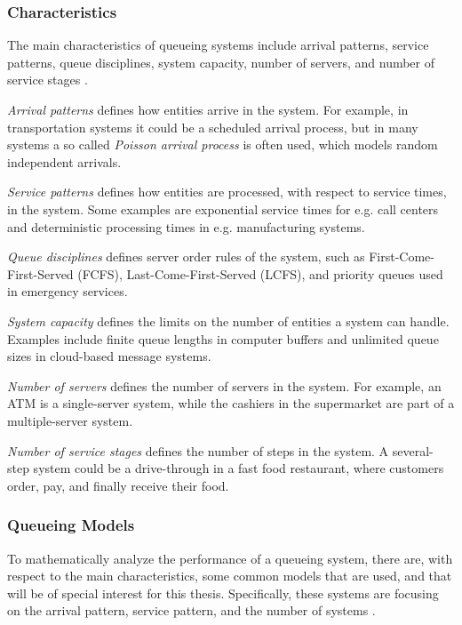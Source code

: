 \documentclass[a4paper,12pt]{article}
\begin{document}
        \subsubsection{Characteristics}
        The main characteristics of queueing systems include arrival patterns, service patterns, queue disciplines, system capacity, number of servers, and number of service stages \cite{shortle2018}.
        
        \textit{Arrival patterns} defines how entities arrive in the system. For example, in transportation systems it could be a scheduled arrival process, but in many systems a so called \textit{Poisson arrival process} is often used, which models random independent arrivals.

        \textit{Service patterns} defines how entities are processed, with respect to service times, in the system. Some examples are exponential service times for e.g. call centers and deterministic processing times in e.g. manufacturing systems. 

        \textit{Queue disciplines} defines server order rules of the system, such as First-Come-First-Served (FCFS), Last-Come-First-Served (LCFS), and priority queues used in emergency services.

        \textit{System capacity} defines the limits on the number of entities a system can handle. Examples include finite queue lengths in computer buffers and unlimited queue sizes in cloud-based message systems.

        \textit{Number of servers} defines the number of servers in the system. For example, an ATM is a single-server system, while the cashiers in the supermarket are part of a multiple-server system. 

        \textit{Number of service stages} defines the number of steps in the system. A several-step system could be a drive-through in a fast food restaurant, where customers order, pay, and finally receive their food. 

        \subsubsection{Queueing Models}
        To mathematically analyze the performance of a queueing system, there are, with respect to the main characteristics, some common models that are used, and that will be of special interest for this thesis. Specifically, these systems are focusing on the arrival pattern, service pattern, and the number of systems \cite{shortle2018}. 
\end{document}

